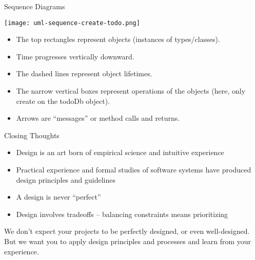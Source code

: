 \documentclass{beamer}
\begin{document}
\begin{frame}[fragile]{Sequence Diagrams}


\begin{center}
\texttt{[image: uml-sequence-create-todo.png]}
\end{center}

\begin{itemize}
\item The top rectangles represent objects (instances of types/classes).
\item Time progresses vertically downward.
\item The dashed lines represent object lifetimes.
\item The narrow vertical boxes represent operations of the objects (here, only create on the todoDb object).
\item Arrows are ``messages'' or method calls and returns.
\end{itemize}


\end{frame}

\begin{frame}[fragile]{Closing Thoughts}


\begin{itemize}
\item Design is an art born of empirical science and intuitive experience
\item Practical experience and formal studies of software systems have produced design principles and guidelines
\item A design is never ``perfect''
\item Design involves tradeoffs -- balancing constraints means prioritizing
\end{itemize}
We don't expect your projects to be perfectly designed, or even well-designed.  But we want you to apply design principles and processes and learn from your experience.

\end{frame}







\end{document}
